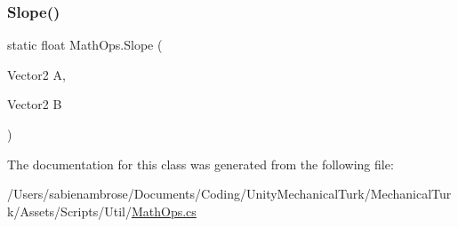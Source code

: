 \mbox{\label{class_math_ops_af1a2e97f206740e26a569a07a663de7d}} 
\subsubsection{\texorpdfstring{Slope()}{Slope()}}
{\footnotesize\ttfamily static float Math\+Ops.\+Slope (\begin{DoxyParamCaption}\item[{Vector2}]{A,  }\item[{Vector2}]{B }\end{DoxyParamCaption})\hspace{0.3cm}{\ttfamily [static]}}



The documentation for this class was generated from the following file\+:\begin{DoxyCompactItemize}
\item 
/\+Users/sabienambrose/\+Documents/\+Coding/\+Unity\+Mechanical\+Turk/\+Mechanical\+Turk/\+Assets/\+Scripts/\+Util/\mbox{\hyperlink{_math_ops_8cs}{Math\+Ops.\+cs}}\end{DoxyCompactItemize}
